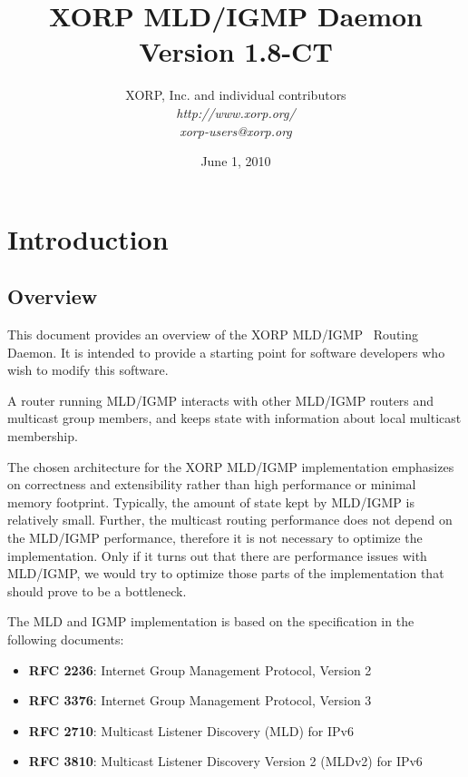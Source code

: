 \documentclass[11pt]{article}
\begin{document}
\title{XORP MLD/IGMP Daemon \\
\vspace{1ex}
Version 1.8-CT}
\author{ XORP, Inc. and individual contributors		\\
         {\it http://www.xorp.org/}			\\
	 {\it xorp-users@xorp.org}
}
\date{June 1, 2010}

\maketitle


\section{Introduction}


\subsection{Overview}

This document provides an overview of the
XORP MLD/IGMP~\cite{MLD-V1,MLD-V2,IGMP-V1,IGMP-V2,IGMP-V3}
Routing Daemon. It is intended to provide a starting point for software
developers who wish to modify this software.

A router running MLD/IGMP interacts with other MLD/IGMP routers and
multicast group members, and keeps state with information about local
multicast membership.

The chosen architecture for the XORP MLD/IGMP implementation emphasizes on
correctness and extensibility rather than high performance or minimal
memory footprint. Typically, the amount of state kept by MLD/IGMP is
relatively small. Further, the multicast routing performance does not
depend on the MLD/IGMP performance, therefore it is not necessary to
optimize the implementation. Only if it turns out that there are
performance issues with MLD/IGMP, we would try to optimize those parts of the
implementation that should prove to be a bottleneck.

The MLD and IGMP implementation is based on the specification in the
 following documents:

\begin{itemize}
  \item{\bf RFC 2236}: Internet Group Management Protocol, Version 2
  \item{\bf RFC 3376}: Internet Group Management Protocol, Version 3
  \item{\bf RFC 2710}: Multicast Listener Discovery (MLD) for IPv6
  \item{\bf RFC 3810}: Multicast Listener Discovery Version 2 (MLDv2) for IPv6
\end{itemize}
\end{document}
